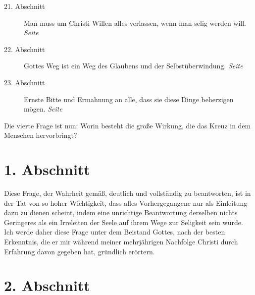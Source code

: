 \begin{description}
\item[21. Abschnitt] Man muss um Christi Willen alles verlassen, wenn man selig
werden will.
\dotfill \textit{Seite~\pageref{kap4_ab21}}\\
\item[22. Abschnitt] Gottes Weg ist ein Weg des Glaubens und der
Selbstüberwindung.
\dotfill \textit{Seite~\pageref{kap4_ab22}}\\
\item[23. Abschnitt] Ernste Bitte und Ermahnung an alle, dass sie diese Dinge
beherzigen mögen.
\dotfill \textit{Seite~\pageref{kap4_ab23}}\\
\end{description}

\newpage

Die vierte Frage ist nun: Worin besteht die große Wirkung, die das Kreuz in dem
Menschen hervorbringt?


\section{1. Abschnitt} \label{kap4_ab1}

Diese Frage, der Wahrheit gemäß, deutlich und vollständig zu beantworten, ist in
der Tat von so hoher Wichtigkeit, dass alles Vorhergegangene nur als Einleitung
dazu zu dienen scheint, indem eine unrichtige Beantwortung derselben nichts
Geringeres als ein Irreleiten der Seele auf ihrem Wege zur Seligkeit sein würde.
Ich werde daher diese Frage unter dem Beistand Gottes, nach der besten
Erkenntnis, die er mir während meiner mehrjährigen Nachfolge Christi durch
Erfahrung davon gegeben hat, gründlich erörtern.

\section{2. Abschnitt} \label{kap4_ab2}

